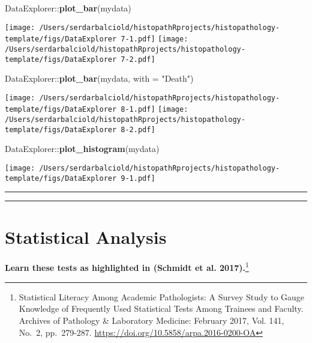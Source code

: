 \documentclass[
]{article}
\newenvironment{Shaded}{\begin{snugshade}}{\end{snugshade}}
\newcommand{\DataTypeTok}[1]{\textcolor[rgb]{0.00,0.34,0.68}{#1}}
\newcommand{\KeywordTok}[1]{\textcolor[rgb]{0.12,0.11,0.11}{\textbf{#1}}}
\newcommand{\NormalTok}[1]{\textcolor[rgb]{0.12,0.11,0.11}{#1}}
\newcommand{\OperatorTok}[1]{\textcolor[rgb]{0.12,0.11,0.11}{#1}}
\newcommand{\StringTok}[1]{\textcolor[rgb]{0.75,0.01,0.01}{#1}}
\begin{document}
\begin{Shaded}
\begin{Highlighting}[]
\NormalTok{DataExplorer}\OperatorTok{::}\KeywordTok{plot_bar}\NormalTok{(mydata)}
\end{Highlighting}
\end{Shaded}

\texttt{[image: /Users/serdarbalciold/histopathRprojects/histopathology-template/figs/DataExplorer 7-1.pdf]}
\texttt{[image: /Users/serdarbalciold/histopathRprojects/histopathology-template/figs/DataExplorer 7-2.pdf]}

\begin{Shaded}
\begin{Highlighting}[]
\NormalTok{DataExplorer}\OperatorTok{::}\KeywordTok{plot_bar}\NormalTok{(mydata, }\DataTypeTok{with =} \StringTok{"Death"}\NormalTok{)}
\end{Highlighting}
\end{Shaded}

\texttt{[image: /Users/serdarbalciold/histopathRprojects/histopathology-template/figs/DataExplorer 8-1.pdf]}
\texttt{[image: /Users/serdarbalciold/histopathRprojects/histopathology-template/figs/DataExplorer 8-2.pdf]}

\begin{Shaded}
\begin{Highlighting}[]
\NormalTok{DataExplorer}\OperatorTok{::}\KeywordTok{plot_histogram}\NormalTok{(mydata)}
\end{Highlighting}
\end{Shaded}

\texttt{[image: /Users/serdarbalciold/histopathRprojects/histopathology-template/figs/DataExplorer 9-1.pdf]}

\begin{center}\rule{0.5\linewidth}{0.5pt}\end{center}

\begin{center}\rule{0.5\linewidth}{0.5pt}\end{center}

\hypertarget{statistical-analysis}{%
\section{Statistical Analysis}\label{statistical-analysis}}

\textbf{Learn these tests as highlighted in (Schmidt et al.
2017).}\footnote{Statistical Literacy Among Academic Pathologists: A
  Survey Study to Gauge Knowledge of Frequently Used Statistical Tests
  Among Trainees and Faculty. Archives of Pathology \& Laboratory
  Medicine: February 2017, Vol. 141, No.~2, pp.~279-287.
  \url{https://doi.org/10.5858/arpa.2016-0200-OA}}
\end{document}
